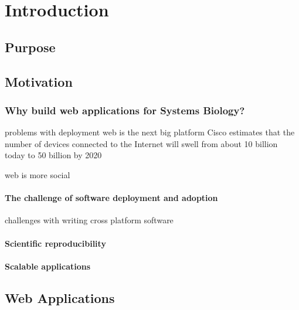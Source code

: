 \chapter{Introduction}

\section{Purpose}

\section{Motivation}

\subsection{Why build web applications for Systems Biology?}

problems with deployment
web is the next big platform \autocite{o2007web}
Cisco estimates that the number of devices connected to the Internet will swell from about 10 billion today to 50 billion by 2020 \autocite{clark2014internet}

web is more social \autocite{dabbish2012social}

\subsubsection{The challenge of software deployment and adoption}
challenges with writing cross platform software \autocite{cusumano1999netscape}

\subsubsection{Scientific reproducibility}
\autocite{peng2011reproducible}

\subsubsection{Scalable applications}

\section{Web Applications}

